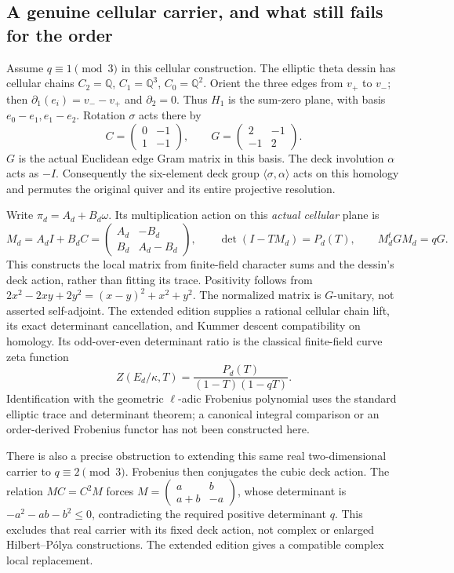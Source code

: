 \documentclass[11pt]{article}
\theoremstyle{definition}\newtheorem{definition}[theorem]{Definition}
\theoremstyle{remark}\newtheorem{remark}[theorem]{Remark}
\begin{document}
\subsection{A genuine cellular carrier, and what still fails for the order}
Assume $q\equiv1\pmod3$ in this cellular construction. The elliptic theta dessin has cellular chains $C_2=\mathbb{Q}$, $C_1=\mathbb{Q}^3$, $C_0=\mathbb{Q}^2$. Orient the three edges from $v_+$ to $v_-$; then $\partial_1(e_i)=v_--v_+$ and $\partial_2=0$. Thus $H_1$ is the sum-zero plane, with basis $e_0-e_1,e_1-e_2$. Rotation $\sigma$ acts there by
\[
 C=\begin{pmatrix}0&-1\\1&-1\end{pmatrix},\qquad
 G=\begin{pmatrix}2&-1\\-1&2\end{pmatrix}.
\]
$G$ is the actual Euclidean edge Gram matrix in this basis. The deck involution $\alpha$ acts as $-I$. Consequently the six-element deck group $\langle\sigma,\alpha\rangle$ acts on this homology and permutes the original quiver and its entire projective resolution.

Write $\pi_d=A_d+B_d\omega$. Its multiplication action on this \emph{actual cellular} plane is
\[
 M_d=A_dI+B_dC=\begin{pmatrix}A_d&-B_d\\B_d&A_d-B_d\end{pmatrix},\qquad
 \det(I-TM_d)=P_d(T),\qquad M_d^tGM_d=qG.
\]
This constructs the local matrix from finite-field character sums and the dessin's deck action, rather than fitting its trace. Positivity follows from $2x^2-2xy+2y^2=(x-y)^2+x^2+y^2$. The normalized matrix is $G$-unitary, not asserted self-adjoint. The extended edition supplies a rational cellular chain lift, its exact determinant cancellation, and Kummer descent compatibility on homology. Its odd-over-even determinant ratio is the classical finite-field curve zeta function
\[
 Z(E_d/\kappa,T)=\frac{P_d(T)}{(1-T)(1-qT)}.
\]
Identification with the geometric $\ell$-adic Frobenius polynomial uses the standard elliptic trace and determinant theorem; a canonical integral comparison or an order-derived Frobenius functor has not been constructed here.

There is also a precise obstruction to extending this same real two-dimensional carrier to $q\equiv2\pmod3$. Frobenius then conjugates the cubic deck action. The relation $MC=C^2M$ forces $M=\left(\begin{smallmatrix}a&b\\a+b&-a\end{smallmatrix}\right)$, whose determinant is $-a^2-ab-b^2\le0$, contradicting the required positive determinant $q$. This excludes that real carrier with its fixed deck action, not complex or enlarged Hilbert--P\'olya constructions. The extended edition gives a compatible complex local replacement.
\end{document}
